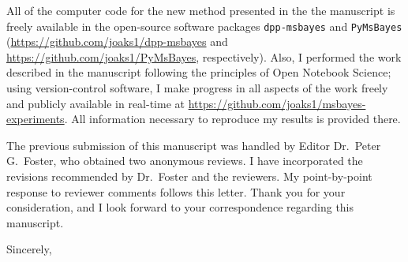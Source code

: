 \documentclass[letterpaper,11pt]{letter}
\begin{document}
\begin{letter}
All of the computer code for the new method presented in the the manuscript is
freely available in the open-source software packages \texttt{dpp-msbayes} and
\texttt{PyMsBayes}
(\href{https://github.com/joaks1/dpp-msbayes}{\url{https://github.com/joaks1/dpp-msbayes}}
and
\href{https://github.com/joaks1/PyMsBayes}{\url{https://github.com/joaks1/PyMsBayes}},
respectively).
Also, I performed the work described in the manuscript following the principles
of Open Notebook Science; using version-control software, I make progress in
all aspects of the work freely and publicly available in real-time at
\href{https://github.com/joaks1/msbayes-experiments}{\url{https://github.com/joaks1/msbayes-experiments}}.
All information necessary to reproduce my results is provided there.

The previous submission of this manuscript was handled by Editor Dr.\  Peter
G.\ Foster, who obtained two anonymous reviews.
I have incorporated the revisions recommended by Dr.\ Foster and the reviewers.
My point-by-point response to reviewer comments follows this letter.
Thank you for your consideration, and I look forward to your correspondence
regarding this manuscript.

\addtolength{\medskipamount}{-6pt}
\closing{Sincerely,}
\end{letter}
\end{document}
